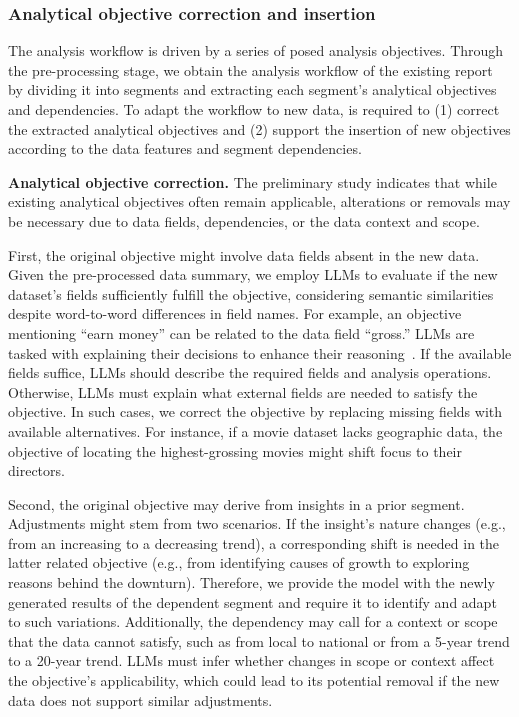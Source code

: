 \subsubsection{Analytical objective correction and insertion}

The analysis workflow is driven by a series of posed analysis objectives. 
Through the pre-processing stage, we obtain the analysis workflow of the existing report by dividing it into segments and extracting each segment's analytical objectives and dependencies. 
To adapt the workflow to new data, \system{} is required to (1) correct the extracted analytical objectives and (2) support the insertion of new objectives according to the data features and segment dependencies. 

\textbf{Analytical objective correction. }
The preliminary study indicates that while existing analytical objectives often remain applicable, alterations or removals may be necessary due to data fields, dependencies, or the data context and scope. 

First, the original objective might involve data fields absent in the new data. 
Given the pre-processed data summary, we employ LLMs to evaluate if the new dataset's fields sufficiently fulfill the objective, considering semantic similarities despite word-to-word differences in field names. 
For example, an objective mentioning ``earn money'' can be related to the data field ``gross.'' 
LLMs are tasked with explaining their decisions to enhance their reasoning~\cite{mialon2023augmented}. 
If the available fields suffice, LLMs should describe the required fields and analysis operations. 
Otherwise, LLMs must explain what external fields are needed to satisfy the objective. 
In such cases, we correct the objective by replacing missing fields with available alternatives. 
For instance, if a movie dataset lacks geographic data, the objective of locating the highest-grossing movies might shift focus to their directors.

Second, the original objective may derive from insights in a prior segment. 
Adjustments might stem from two scenarios. 
If the insight's nature changes (e.g., from an increasing to a decreasing trend), a corresponding shift is needed in the latter related objective (e.g., from identifying causes of growth to exploring reasons behind the downturn). 
Therefore, we provide the model with the newly generated results of the dependent segment and require it to identify and adapt to such variations. 
Additionally, the dependency may call for a context or scope that the data cannot satisfy, such as from local to national or from a 5-year trend to a 20-year trend. 
LLMs must infer whether changes in scope or context affect the objective's applicability, which could lead to its potential removal if the new data does not support similar adjustments. 

